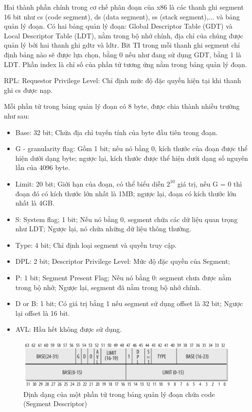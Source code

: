 \documentclass[12pt]{report}
\begin{document}
Hai thành phần chính trong cơ chế phân đoạn của x86 là các thanh ghi segment 16 bit như cs (code segment), ds (data segment), ss (stack segment),... và bảng quản lý đoạn. Có hai bảng quản lý đoạn: Global Descriptor Table (GDT) và Local Descriptor Table (LDT), nằm trong bộ nhớ chính, địa chỉ của chúng được quản lý bởi hai thanh ghi gdtr và ldtr. Bit TI trong mỗi thanh ghi segment chỉ định bảng nào sẽ được lựa chọn, bằng 0 nếu như đang sử dụng GDT, bằng 1 là LDT. Phần index là chỉ số của phần tử tương ứng nằm trong bảng quản lý đoạn. 

RPL: Requestor Privilege Level: Chỉ định mức độ đặc quyền hiện tại khi thanh ghi cs được nạp. 

Mỗi phần tử trong bảng quản lý đoạn có 8 byte, được chia thành nhiều trường như sau: 
\begin{itemize}
\item Base: 32 bit; Chứa địa chỉ tuyến tính của byte đầu tiên trong đoạn. 
\item G - granularity flag: Gồm 1 bit; nếu nó bằng 0, kích thước của đoạn được thể hiện dưới dạng byte; ngược lại, kích thước được thể hiện dưới dạng số nguyên lần của 4096 byte. 
\item Limit: 20 bit; Giới hạn của đoạn, có thể biểu diễn $2^{10}$ giá trị, nếu G = 0 thì đoạn đó có kích thước lớn nhất là 1MB; ngược lại, đoạn có kích thước lớn nhất là 4GB.
\item S: System flag; 1 bit; Nếu nó bằng 0, segment chứa các dữ liệu quan trọng như LDT; Ngược lại, nó chứa những dữ liệu thông thường. 
\item Type: 4 bit; Chỉ định loại segment và quyền truy cập.
\item DPL: 2 bit; Descriptor Privilege Level: Mức độ đặc quyền của Segment; 
\item P: 1 bit; Segment Present Flag; Nếu nó bằng 0: segment chưa được nằm trong bộ nhớ; Ngược lại, segment đã nằm trong bộ nhớ chính. 
\item D or B: 1 bit; Có giá trị bằng 1 nếu 	segment sử dụng offset là 32 bit; Ngược lại offset là 16 bit.
\item AVL: Hầu hết không được sử dụng. 
\end{itemize}

\begin{figure}[h]
\centering
\caption{Định dạng của một phần tử trong bảng quản lý đoạn chứa code (Segment Descriptor)}
\includegraphics[width=\textwidth]{code_segment.png}
\end{figure}
\end{document}

